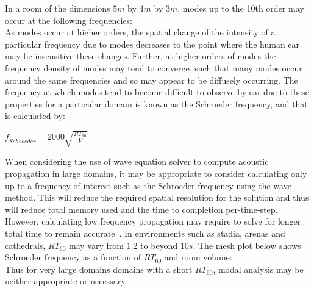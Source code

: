 In a room of the dimensions $5m$ by $4m$ by $3m$, modes up to the 10th order may occur at the following frequencies:\\

As modes occur at higher orders, the spatial change of the intensity of a particular frequency due to modes decreases to the point where the human ear may be insensitive these changes. Further, at higher orders of modes the frequency density of modes may tend to converge, such that many modes occur around the same frequencies and so may appear to be diffusely occurring. The frequency at which modes tend to become difficult to observe by ear due to these properties for a particular domain is known as the Schroeder frequency, and that is calculated by:\\
\begin{center}
$ \textit{f}_{Schroeder} = 2000 \sqrt{\frac{RT_{60}}{V}} $\\
\end{center}
When considering the use of wave equation solver to compute acoustic propagation in large domains, it may be appropriate to consider calculating only up to a frequency of interest such as the Schroeder frequency using the wave method. This will reduce the required spatial resolution for the solution and thus will reduce total memory used and the time to completion per-time-step. However, calculating low frequency propagation may require to solve for longer total time to remain accurate~\cite{Bilbao2004a}. In environments such as stadia, arenas and cathedrals, $RT_{60}$ may vary from $1.2$ to beyond $10s$. The mesh plot below shows Schroeder frequency as a function of $RT_{60}$ and room volume: \\

Thus for very large domains domains with a short $RT_{60}$, modal analysis may be neither appropriate or necessary.
